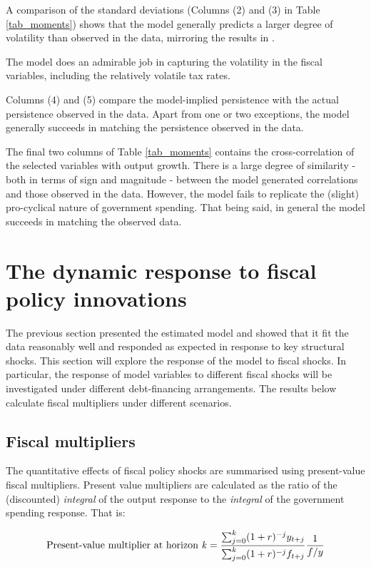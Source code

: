 \documentclass[a4paper,11pt]{article}
\numberwithin{equation}{section}
\begin{document}
	A comparison of the standard deviations (Columns (2) and (3) in Table \ref{tab_moments}) shows that the model generally predicts a larger degree of volatility than observed in the data, mirroring the results in \cite{steinbach2014}. 
	
	The model does an admirable job in capturing the volatility in the fiscal variables, including the relatively volatile tax rates.  
	
	Columns (4) and (5) compare the model-implied persistence with the actual persistence observed in the data. Apart from one or two exceptions, the model generally succeeds in matching the persistence observed in the data.
	
	The final two columns of Table \ref{tab_moments} contains the cross-correlation of the selected variables with output growth. There is a large degree of similarity - both in terms of sign and magnitude - between the model generated correlations and those observed in the data. However, the model fails to replicate the (slight) pro-cyclical nature of government spending. That being said, in general the model succeeds in matching the observed data. 
	


	\section{The dynamic response to fiscal policy innovations} \label{simulations}
	
	The previous section presented the estimated model and showed that it fit the data reasonably well and responded as expected in response to key structural shocks. This section will explore the response of the model to fiscal shocks. In particular, the response of model variables to different fiscal shocks will be investigated under different debt-financing arrangements. The results below calculate fiscal multipliers under different scenarios.
	
	
	\subsection{Fiscal multipliers}
	
	The quantitative effects of fiscal policy shocks are summarised using present-value fiscal multipliers. Present value multipliers are calculated as the ratio of the (discounted) \textit{integral} of the output response to the \textit{integral} of the government spending response. That is:
	
	\begin{equation}
	\text{Present-value multiplier at horizon \textit{k}} = \frac{\sum_{j=0}^{k}(1+r)^{-j}y_{t+j}}{\sum_{j=0}^{k}(1+r)^{-j}f_{t+j}}\frac{1}{f/y}
	\end{equation}
	
\end{document}
